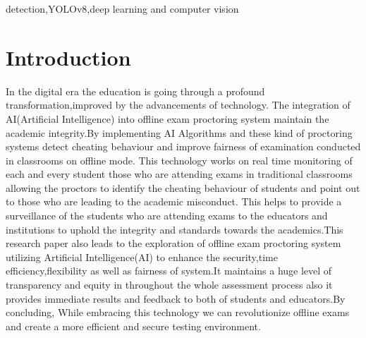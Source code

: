 \documentclass[conference]{IEEEtran}
\begin{document}
\begin{IEEEkeywords}
detection,YOLOv8,deep learning and computer vision
\end{IEEEkeywords}

\section{Introduction}
In the digital era the education is going through a profound transformation,improved by the advancements of technology.
The integration of AI(Artificial Intelligence) into offline exam proctoring system maintain the academic integrity.By implementing AI Algorithms and these kind of proctoring systems detect cheating behaviour and improve fairness of examination conducted in classrooms on offline mode. This technology works on real time monitoring of each and every student those who are attending exams in traditional classrooms allowing the proctors to identify the cheating behaviour of students and point out to those who are leading to the academic misconduct.
This helps to provide a surveillance of the students who are attending exams to the educators and institutions to uphold the integrity and standards towards the academics.This research paper also leads to the exploration of offline exam proctoring system utilizing Artificial Intelligence(AI) to enhance the  security,time efficiency,flexibility as well as fairness of system.It maintains a huge level of transparency and equity in throughout the whole assessment process also it provides immediate results and feedback to both of students and educators.By concluding, While embracing this technology we can revolutionize offline exams and create a more efficient and secure testing environment.
\end{document}
